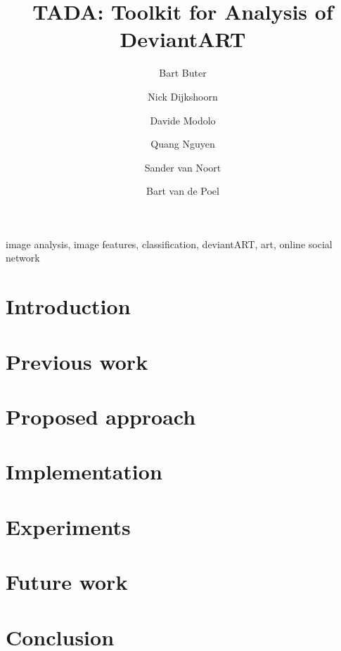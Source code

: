 \documentclass[%
        final,
        notitlepage,
        narroweqnarray,
        inline,
        ]{ieee}
\begin{document}
\title[TADA: Toolkit for Analysis of DeviantART]{TADA: Toolkit for Analysis of DeviantART}
\author{Bart Buter \and Nick Dijkshoorn \and Davide Modolo \and Quang Nguyen \and Sander van Noort \and Bart van de Poel}

\maketitle


\begin{abstract}

\end{abstract}


\begin{keywords}
image analysis, image features, classification, deviantART, art, online social network
\end{keywords}


\section{Introduction}



\section{Previous work}


\section{Proposed approach}



\section{Implementation}



\section{Experiments}



\section{Future work}


\section{Conclusion}


\nocite{*}



\end{document}
